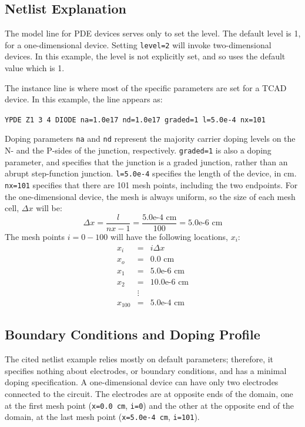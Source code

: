 \subsection{Netlist Explanation}
The model line for PDE devices serves only to set the level.  The default level
is 1, for a one-dimensional device.  Setting \texttt{level=2} will invoke
two-dimensional devices.  In this example, the level is not explicitly set, and
so \Xyce{} uses the default value which is 1.

The instance line is where most of the specific parameters are set for a
TCAD device.  In this example, the line appears as:

\texttt{YPDE Z1 3 4 DIODE na=1.0e17 nd=1.0e17 graded=1 l=5.0e-4 nx=101}

Doping parameters \texttt{na} and \texttt{nd} represent the
majority carrier doping levels on the N- and the P-sides of the
junction, respectively.  \texttt{graded=1} is also a doping parameter, and
specifies that the junction is a graded junction, rather than an abrupt
step-function junction.  \texttt{l=5.0e-4} specifies the length of
the device, in cm.  \texttt{nx=101} specifies that there are
101 mesh points, including the two endpoints.  For the one-dimensional
device, the mesh is always uniform, so the size of 
each mesh cell, $\Delta x$ will be:
\begin{equation}
  \Delta x = \frac{l}{nx-1} = \frac{\mbox{5.0e-4 cm}}{\mbox{100}} = \mbox{5.0e-6 cm}
\end{equation}
The mesh points $i=0 - 100$ will have the following locations, $x_{i}$:
\begin{eqnarray*}
  x_{i}   &=& i \Delta x\\
  x_{o}   &=& \mbox{0.0 cm} \\
  x_{1}   &=& \mbox{5.0e-6 cm} \\
  x_{2}   &=& \mbox{10.0e-6 cm} \\
          &\vdots& \\
  x_{100} &=& \mbox{5.0e-4 cm}
\end{eqnarray*}

\subsection{Boundary Conditions and Doping Profile}
The cited netlist example relies mostly on default parameters; therefore, it 
specifies nothing about electrodes, or boundary conditions, and has a minimal 
doping specification. A one-dimensional device can have only two electrodes 
connected to the circuit. The electrodes are at opposite ends of the domain, 
one at the first mesh point (\texttt{x=0.0 cm}, \texttt{i=0}) 
and the other at the opposite end of the domain, at the last mesh point 
(\texttt{x=5.0e-4 cm}, \texttt{i=101}).

